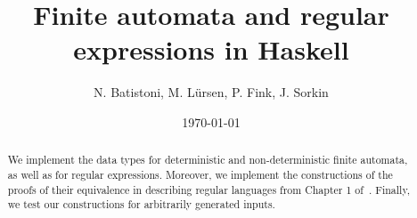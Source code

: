 \documentclass[12pt,a4paper]{article}
\title{Finite automata and regular expressions in Haskell}
\author{N. Batistoni, M. L\"ursen, P. Fink, J. Sorkin}
\date{\today}
\begin{document}
\maketitle

\begin{abstract}
    We implement the data types for deterministic and non-deterministic finite automata,
    as well as for regular expressions.
    Moreover, we implement the constructions of the proofs of their equivalence in describing regular languages
    from Chapter 1 of~\cite{sipser2012}.
    Finally, we test our constructions for arbitrarily generated inputs.
\end{abstract}

\vfill

\setcounter{tocdepth}{1}
\tableofcontents

\clearpage
























\end{document}
